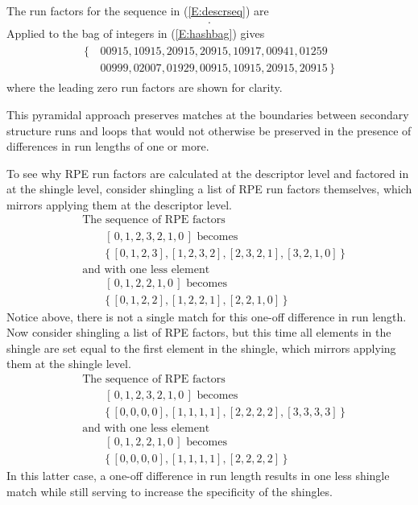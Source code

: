\documentclass[a4,center,fleqn]{NAR}
\begin{document}
The run factors for the sequence in (\ref{E:descrseq}) are
\begin{align}
    [\, 0, 1, 2, 2, 1, 0, 0, 0, 0, 0, 0, 1, 2, 2, 1, 0 \,].
\end{align}
Applied to the bag of integers in (\ref{E:hashbag}) gives
\begin{align}\label{E:rpebag}
    \begin{split}
    \{\,&00915, 10915, 20915, 20915, 10917, 00941, 01259 \\
        &00999, 02007, 01929, 00915, 10915, 20915, 20915 \,\}
    \end{split}
\end{align}
where the leading zero run factors are shown for clarity. 

This pyramidal approach preserves matches at the boundaries between secondary structure runs and loops that would not otherwise be preserved in the presence of differences in run lengths of one or more. 

To see why RPE run factors are calculated at the descriptor level and factored in at the shingle level, consider shingling a list of RPE run factors themselves, which mirrors applying them at the descriptor level. 
\begin{align*}
    &\text{The sequence of RPE factors} \\
    &\qquad[\, 0, 1, 2, 3, 2, 1, 0 \,] \text{ becomes} \\
    &\qquad\{\, [0, 1, 2, 3], [1, 2, 3, 2], [2, 3, 2, 1], [3, 2, 1, 0] \,\} \\
    &\text{and with one less element} \\
    &\qquad[\, 0, 1, 2, 2, 1, 0 \,] \text{ becomes} \\
    &\qquad\{\, [0, 1, 2, 2], [1, 2, 2, 1], [2, 2, 1, 0] \,\}
\end{align*}
Notice above, there is not a single match for this one-off difference in run length.
Now consider shingling a list of RPE factors, but this time all elements in the shingle are set equal to the first element in the shingle, which mirrors applying them at the shingle level. 
\begin{align*}
    &\text{The sequence of RPE factors} \\
    &\qquad[\, 0, 1, 2, 3, 2, 1, 0 \,] \text{ becomes} \\
    &\qquad\{\, [0, 0, 0, 0], [1, 1, 1, 1], [2, 2, 2, 2], [3, 3, 3, 3] \,\} \\
    &\text{and with one less element} \\
    &\qquad[\, 0, 1, 2, 2, 1, 0 \,] \text{ becomes} \\
    &\qquad\{\, [0, 0, 0, 0], [1, 1, 1, 1], [2, 2, 2, 2] \,\}
\end{align*}
In this latter case, a one-off difference in run length results in one less shingle match while still serving to increase the specificity of the shingles. 
\end{document}
